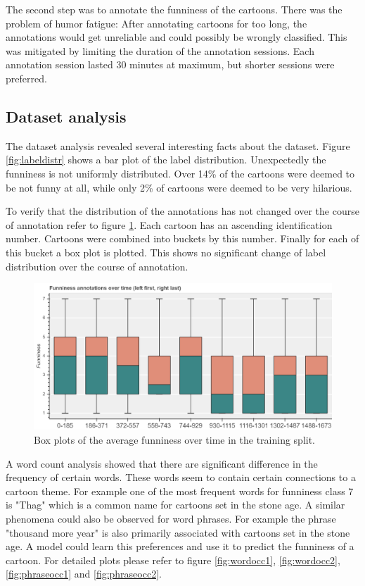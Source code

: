 \documentclass[draft,final,oneside]{vutinfth} %
\begin{document}
The second step was to annotate the funniness of the cartoons. There was the problem of humor fatigue: After annotating cartoons for too long, the annotations would get unreliable and could possibly be wrongly classified. This was mitigated by limiting the duration of the annotation sessions. Each annotation session lasted 30 minutes at maximum, but shorter sessions were preferred. 

\subsection{Dataset analysis}

The dataset analysis revealed several interesting facts about the dataset. Figure \ref{fig:labeldistr} shows a bar plot of the label distribution. Unexpectedly the funniness is not uniformly distributed. Over 14\% of the cartoons were deemed to be not funny at all, while only 2\% of cartoons were deemed to be very hilarious.

To verify that the distribution of the annotations has not changed over the course of annotation refer to figure \ref{fig:boxplottime}. Each cartoon has an ascending identification number. Cartoons were  combined into buckets by this number. Finally for each of this bucket a box plot is plotted. This shows no significant change of label distribution over the course of annotation.

\begin{figure}
	\centering
  	\includegraphics[width=1.0\textwidth]{graphics/average_funniness_over_time}
	\caption{Box plots of the average funniness over time in the training split.}
	\label{fig:boxplottime}
\end{figure}

A word count analysis showed that there are significant difference in the frequency of certain words. These words seem to contain certain connections to a cartoon theme. For example one of the most frequent words for funniness class 7 is "Thag" which is a common name for cartoons set in the stone age. A similar phenomena could also be observed for word phrases. For example the phrase "thousand more year" is also primarily associated with cartoons set in the stone age. A model could learn this preferences and use it to predict the funniness of a cartoon. For detailed plots please refer to figure \ref{fig:wordocc1}, \ref{fig:wordocc2}, \ref{fig:phraseocc1} and \ref{fig:phraseocc2}.
\end{document}
